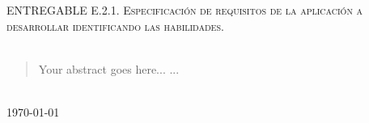 \documentclass[12pt]{article} %
\begin{document}
\begin{titlepage}
\textsc{\Large ENTREGABLE E.2.1. Especificación de requisitos de la aplicación a desarrollar identificando las habilidades.}\\[0.5cm] %

\HRule \\[0.4cm]
\renewcommand{\abstractname}{RESUMEN DEL DOCUMENTO - CAMBIO}
\begin{abstract}
Your abstract goes here...
...
\end{abstract}
\HRule \\[0.4cm]

{\large \today}\\[3cm] %


\vfill %

\end{titlepage}


\tableofcontents %

\newpage %





\end{document}

